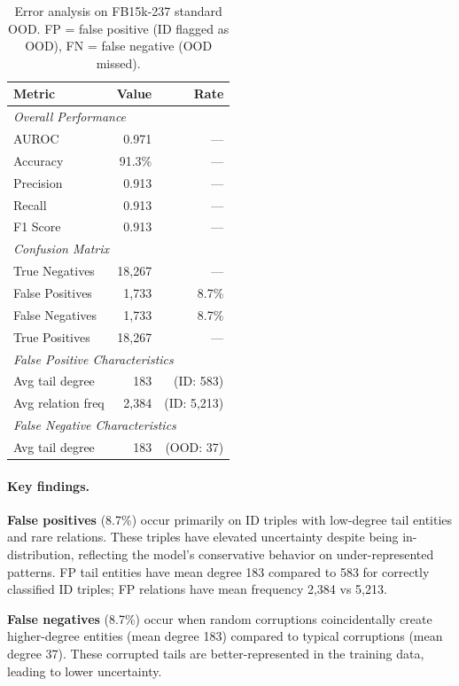 \documentclass[accepted]{uai2024}  %
\begin{document}
\begin{table}[h]
\centering
\caption{Error analysis on FB15k-237 standard OOD. FP = false positive (ID flagged as OOD), FN = false negative (OOD missed).}
\label{tab:error_analysis}
\small
\begin{tabular}{lrr}
\toprule
Metric & Value & Rate \\
\midrule
\multicolumn{3}{l}{\textit{Overall Performance}} \\
AUROC & 0.971 & --- \\
Accuracy & 91.3\% & --- \\
Precision & 0.913 & --- \\
Recall & 0.913 & --- \\
F1 Score & 0.913 & --- \\
\midrule
\multicolumn{3}{l}{\textit{Confusion Matrix}} \\
True Negatives & 18,267 & --- \\
False Positives & 1,733 & 8.7\% \\
False Negatives & 1,733 & 8.7\% \\
True Positives & 18,267 & --- \\
\midrule
\multicolumn{3}{l}{\textit{False Positive Characteristics}} \\
Avg tail degree & 183 & (ID: 583) \\
Avg relation freq & 2,384 & (ID: 5,213) \\
\midrule
\multicolumn{3}{l}{\textit{False Negative Characteristics}} \\
Avg tail degree & 183 & (OOD: 37) \\
\bottomrule
\end{tabular}
\end{table}

\paragraph{Key findings.}
\textbf{False positives} (8.7\%) occur primarily on ID triples with low-degree tail entities and rare relations.
These triples have elevated uncertainty despite being in-distribution, reflecting the model's conservative behavior on under-represented patterns.
FP tail entities have mean degree 183 compared to 583 for correctly classified ID triples; FP relations have mean frequency 2,384 vs 5,213.

\textbf{False negatives} (8.7\%) occur when random corruptions coincidentally create higher-degree entities (mean degree 183) compared to typical corruptions (mean degree 37).
These corrupted tails are better-represented in the training data, leading to lower uncertainty.
\end{document}
